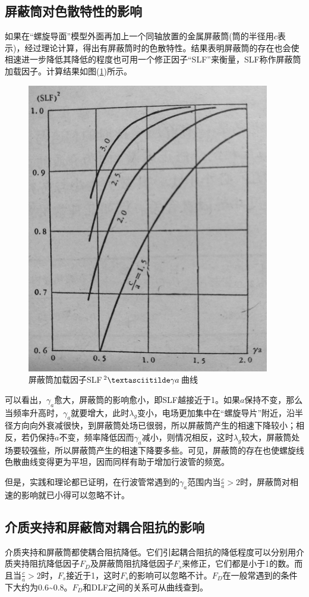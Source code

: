 \subsection{屏蔽筒对色散特性的影响}
如果在“螺旋导面”模型外面再加上一个同轴放置的金属屏蔽筒(筒的半径用$ c $表示)，经过理论计算，得出有屏蔽筒时的色散特性。结果表明屏蔽筒的存在也会使相速进一步降低其降低的程度也可用一个修正因子“SLF”来衡量，SLF称作屏蔽筒加载因子。计算结果如图(\ref{ch3-11})所示。
\begin{figure}[phtb]
	\centering
	\includegraphics[width=0.48\linewidth]{figure/ch3-11}
	\caption{屏蔽筒加载因子SLF$ ^2 \textasciitilde \gamma a$曲线}
	\label{ch3-11}
\end{figure}

可以看出，$ \gamma_a $愈大，屏蔽筒的影响愈小，即SLF越接近于1。如果$ a $保持不变，那么当频率升高时，$ \gamma_a $就要增大，此时$ \lambda_g $变小，电场更加集中在“螺旋导片”附近，沿半径方向向外衰减很快，到屏蔽筒处场已很弱，所以屏蔽筒产生的相速下降较小；相反，若仍保持$ a $不变，频率降低因而$ \gamma_a $减小，则情况相反，这时$ \lambda_g $较大，屏蔽筒处场要较强些，所以屏蔽筒产生的相速下降要多些。可见，屏蔽筒的存在也使螺旋线色散曲线变得更为平坦，因而同样有助于增加行波管的频宽。

但是，实践和理论都已证明，在行波管常遇到的$ \gamma_a $范围内当$ \frac{c}{a} > 2$时，屏蔽筒对相速的影响就已小得可以忽略不计。
\subsection{介质夹持和屏蔽筒对耦合阻抗的影响}
介质夹持和屏蔽筒都使耦合阻抗降低。它们引起耦合阻抗的降低程度可以分别用介质夹持阻抗降低因子$ F_D $及屏蔽筒阻抗降低因子$ F_s $来修正，它们都是小于1的数。而且当$ \frac{c}{a} > 2$时，$ F_s $接近于1，这时$ F_s $的影响可以忽略不计。$ F_D $在一般常遇到的条件下大约为0.6\textasciitilde0.8。$ F_D $和DLF之间的关系可从曲线查到。
